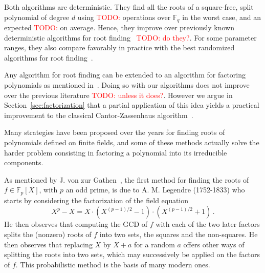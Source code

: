 \documentclass{sig-alternate}
\newcommand{\ff}[1]{\mathbb{F}_{#1}}
\newcommand{\dd}{d}
\newcommand{\qq}{q}
\newcommand{\basef}{\ff{\qq}}
\newcounter{algo}
\newcommand{\todo}[1]{\textcolor{red}{TODO: #1}}
\renewcommand{\paragraph}[1]{\smallskip\noindent{{\bf \rm #1.}}}
\begin{document}
Both algorithms are deterministic. They find all the roots of a
square-free, split polynomial of degree $\dd$ using \todo{} operations
over $\basef$ in the worst case, and an expected \todo{} on
average. Hence, they improve over previously known deterministic
algorithms for root finding~\cite{Shoup91b} \todo{do they?}. For some
parameter ranges, they also compare favorably in practice with the
best randomized algorithms for root finding~\cite{berl70,cantor1981}.

Any algorithm for root finding can be extended to an algorithm for
factoring polynomials as mentioned in~\cite{Rabin79}. Doing so with
our algorithms does not improve over the previous literature
\todo{unless it does?}. However we argue in
Section~\ref{sec:factorization} that a partial application of this
idea yields a practical improvement to the classical Cantor-Zassenhaus
algorithm~\cite{cantor1981}.



\paragraph{Previous work:} Many strategies have been proposed over the years for finding roots of polynomials defined on finite fields, and some of these methods actually solve the harder problem consisting in factoring a polynomial into its irreducible components. 

As mentioned by J. von zur Gathen~\cite{Gathen06}, the first method for finding the roots of $f \in \mathbb{F}_p[X]$, with $p$ an odd prime, is due to A. M. Legendre (1752-1833) who starts by considering the factorization of the field equation
$$X^{p}-X=X \cdot (X^{(p-1)/2}-1) \cdot (X^{(p-1)/2}+1)\,.$$
He then observes that computing the GCD of $f$ with each of the two later factors splits the (nonzero) roots of $f$ into two sets, the squares and the non-squares. He then observes that replacing $X$ by $X+a$ for a random $a$  offers other ways of splitting the roots into two sets, which may successively be applied on the factors of $f$. This probabilistic method is the basis of many modern ones.

\end{document}
